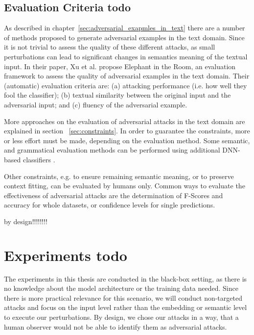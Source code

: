 \subsection{Evaluation Criteria todo}
    \label{sec:evaluation_tb}
As described in chapter~\ref{sec:adversarial_exapmles_in_text} there are a number of methods proposed to generate adversarial examples in the text domain. Since it is not trivial to assess the quality of these different attacks, as small perturbations can lead to significant changes in semantics meaning of the textual input. In their paper, Xu et al. propose Elephant in the Room, an evaluation framework to assess the quality of adversarial examples in the text domain\cite{xu2020elephant}. Their (automatic) evaluation criteria are:
(a) attacking performance (i.e. how well they fool the classifier); 
(b) textual similarity between the original input and the adversarial input; and
(c) fluency of the adversarial example.

More approaches on the evaluation of adversarial attacks in the text domain are explained in section ~\ref{sec:constraints}. In order to guarantee the constraints, more or less effort must be made, depending on the evaluation method. Some semantic, and grammatical evaluation methods can be performed using additional DNN-based classifiers \cite{ebrahimi2017hotflip, jin2019bert, garg2020bae}.

Other constraints, e.g. to ensure remaining semantic meaning, or to preserve context fitting, can be evaluated by humans only. 
Common ways to evaluate the effectiveness of adversarial attacks are the determination of F-Scores and accuracy for whole datasets, or confidence levels for single predictions. 

by design!!!!!!!!


\section{Experiments todo}
\label{sec:experiments}

The experiments in this thesis are conducted in the black-box setting, as there is no knowledge about the model architecture or the training data needed. Since there is more practical relevance for this scenario, we will conduct non-targeted attacks and focus on the input level rather than the embedding or semantic level to execute our perturbations. 
By design, we chose our attacks in a way, that a human observer would not be able to identify them as adversarial attacks. 

